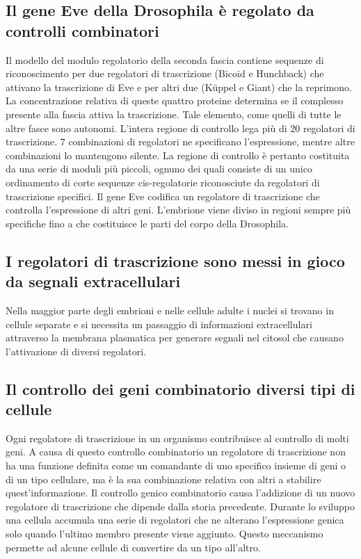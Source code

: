 \subsection{Il gene Eve della Drosophila \`e regolato da controlli combinatori}
Il modello del modulo regolatorio della seconda fascia contiene sequenze di riconoscimento per due regolatori di trascrizione (Bicoid e Hunchback) che attivano la trascrizione di Eve e 
per altri due (K\"uppel e Giant) che la reprimono. La concentrazione relativa di queste quattro proteine determina se il complesso presente alla fascia attiva la trascrizione. Tale 
elemento, come quelli di tutte le altre fasce sono autonomi. L'intera regione di controllo lega pi\`u di $20$ regolatori di trascrizione. $7$ combinazioni di regolatori ne specificano
l'espressione, mentre altre combinazioni lo mantengono silente. La regione di controllo \`e pertanto costituita da una serie di moduli pi\`u piccoli, ognuno dei quali consiste di un
unico ordinamento di corte sequenze cis-regolatorie riconosciute da regolatori di trascrizione specifici. Il gene Eve codifica un regolatore di trascrizione che controlla l'espressione
di altri geni. L'embrione viene diviso in regioni sempre pi\`u specifiche fino a che costituisce le parti del corpo della Drosophila. 
\subsection{I regolatori di trascrizione sono messi in gioco da segnali extracellulari}
Nella maggior parte degli embrioni e nelle cellule adulte i nuclei si trovano in cellule separate e si necessita un passaggio di informazioni extracellulari attraverso la membrana
plasmatica per generare segnali nel citosol che causano l'attivazione di diversi regolatori. 
\subsection{Il controllo dei geni combinatorio diversi tipi di cellule}
Ogni regolatore di trascrizione in un organismo contribuisce al controllo di molti geni. A causa di questo controllo combinatorio un regolatore di trascrizione non ha una funzione 
definita come un comandante di uno specifico insieme di geni o di un tipo cellulare, ma \`e la sua combinazione relativa con altri a stabilire quest'informazione. Il controllo genico
combinatorio causa l'addizione di un nuovo regolatore di trascrizione che dipende dalla storia precedente. Durante lo sviluppo una cellula accumula una serie di regolatori che
ne alterano l'espressione genica solo quando l'ultimo membro presente viene aggiunto. Questo meccanismo permette ad alcune cellule di convertire da un tipo all'altro. 
